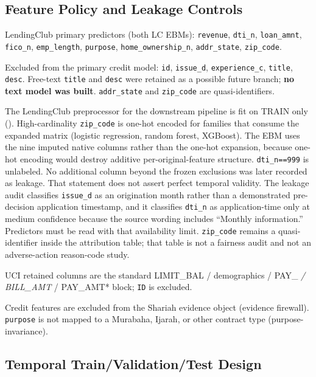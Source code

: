 \documentclass{ieeeaccess}
\makeatletter
\DeclareRobustCommand{\sha}[1]{{\ttfamily\expandafter\@shaloop\detokenize{#1}\relax}}
\def\@shaloop#1{%
  \ifx\relax#1\else#1\allowbreak\expandafter\@shaloop\fi}
\makeatother
\begin{document}
\subsection{Feature Policy and Leakage Controls}

LendingClub primary predictors (both LC EBMs): \texttt{revenue}, \texttt{dti\_n}, \texttt{loan\_amnt}, \texttt{fico\_n}, \texttt{emp\_length}, \texttt{purpose}, \texttt{home\_ownership\_n}, \texttt{addr\_state}, \texttt{zip\_code}.

Excluded from the primary credit model: \texttt{id}, \texttt{issue\_d}, \texttt{experience\_c}, \texttt{title}, \texttt{desc}. Free-text \texttt{title} and \texttt{desc} were retained as a possible future branch; \textbf{no text model was built}. \texttt{addr\_state} and \texttt{zip\_code} are quasi-identifiers.

The LendingClub preprocessor for the downstream pipeline is fit on TRAIN only (\sha{lendingclub_preprocessor.joblib}). High-cardinality \texttt{zip\_code} is one-hot encoded for families that consume the expanded matrix (logistic regression, random forest, XGBoost). The EBM uses the nine imputed native columns rather than the one-hot expansion, because one-hot encoding would destroy additive per-original-feature structure. \texttt{dti\_n==999} is unlabeled. No additional column beyond the frozen exclusions was later recorded as leakage. That statement does not assert perfect temporal validity. The leakage audit classifies \texttt{issue\_d} as an origination month rather than a demonstrated pre-decision application timestamp, and it classifies \texttt{dti\_n} as application-time only at medium confidence because the source wording includes ``Monthly information.'' Predictors must be read with that availability limit. \texttt{zip\_code} remains a quasi-identifier inside the attribution table; that table is not a fairness audit and not an adverse-action reason-code study.

UCI retained columns are the standard LIMIT\_BAL / demographics / PAY\_\emph{ / BILL\_AMT} / PAY\_AMT* block; \texttt{ID} is excluded.

Credit features are excluded from the Shariah evidence object (evidence firewall). \texttt{purpose} is not mapped to a Murabaha, Ijarah, or other contract type (purpose-invariance).

\subsection{Temporal Train/Validation/Test Design}
\end{document}
